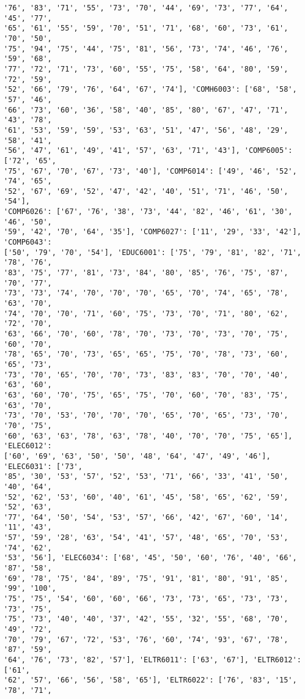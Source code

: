 \documentclass[11pt]{article}
\begin{document}
\begin{Verbatim}[commandchars=\\\{\}]
'76', '83', '71', '55', '73', '70', '44', '69', '73', '77', '64', '45', '77',
'65', '61', '55', '59', '70', '51', '71', '68', '60', '73', '61', '70', '50',
'75', '94', '75', '44', '75', '81', '56', '73', '74', '46', '76', '59', '68',
'77', '72', '71', '73', '60', '55', '75', '58', '64', '80', '59', '72', '59',
'52', '66', '79', '76', '64', '67', '74'], 'COMH6003': ['68', '58', '57', '46',
'66', '73', '60', '36', '58', '40', '85', '80', '67', '47', '71', '43', '78',
'61', '53', '59', '59', '53', '63', '51', '47', '56', '48', '29', '58', '41',
'56', '47', '61', '49', '41', '57', '63', '71', '43'], 'COMP6005': ['72', '65',
'75', '67', '70', '67', '73', '40'], 'COMP6014': ['49', '46', '52', '74', '65',
'52', '67', '69', '52', '47', '42', '40', '51', '71', '46', '50', '54'],
'COMP6026': ['67', '76', '38', '73', '44', '82', '46', '61', '30', '46', '50',
'59', '42', '70', '64', '35'], 'COMP6027': ['11', '29', '33', '42'], 'COMP6043':
['50', '79', '70', '54'], 'EDUC6001': ['75', '79', '81', '82', '71', '78', '76',
'83', '75', '77', '81', '73', '84', '80', '85', '76', '75', '87', '70', '77',
'73', '73', '74', '70', '70', '70', '65', '70', '74', '65', '78', '63', '70',
'74', '70', '70', '71', '60', '75', '73', '70', '71', '80', '62', '72', '70',
'63', '66', '70', '60', '78', '70', '73', '70', '73', '70', '75', '60', '70',
'78', '65', '70', '73', '65', '65', '75', '70', '78', '73', '60', '65', '73',
'73', '70', '65', '70', '70', '73', '83', '83', '70', '70', '40', '63', '60',
'63', '60', '70', '75', '65', '75', '70', '60', '70', '83', '75', '63', '70',
'73', '70', '53', '70', '70', '70', '65', '70', '65', '73', '70', '70', '75',
'60', '63', '63', '78', '63', '78', '40', '70', '70', '75', '65'], 'ELEC6012':
['60', '69', '63', '50', '50', '48', '64', '47', '49', '46'], 'ELEC6031': ['73',
'85', '30', '53', '57', '52', '53', '71', '66', '33', '41', '50', '40', '64',
'52', '62', '53', '60', '40', '61', '45', '58', '65', '62', '59', '52', '63',
'77', '64', '50', '54', '53', '57', '66', '42', '67', '60', '14', '11', '43',
'57', '59', '28', '63', '54', '41', '57', '48', '65', '70', '53', '74', '62',
'53', '56'], 'ELEC6034': ['68', '45', '50', '60', '76', '40', '66', '87', '58',
'69', '78', '75', '84', '89', '75', '91', '81', '80', '91', '85', '99', '100',
'75', '75', '54', '60', '60', '66', '73', '73', '65', '73', '73', '73', '75',
'75', '73', '40', '40', '37', '42', '55', '32', '55', '68', '70', '49', '72',
'70', '79', '67', '72', '53', '76', '60', '74', '93', '67', '78', '87', '59',
'64', '76', '73', '82', '57'], 'ELTR6011': ['63', '67'], 'ELTR6012': ['61',
'62', '57', '66', '56', '58', '65'], 'ELTR6022': ['76', '83', '15', '78', '71',

\end{Verbatim}
\end{document}
